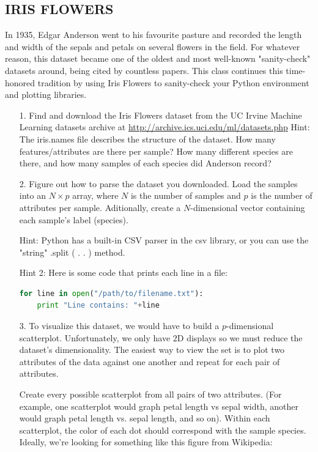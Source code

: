 \documentclass[10pt, a4paper]{article}
\begin{document}
\begin{Problem}
\section{IRIS FLOWERS}
In 1935, Edgar Anderson went to his favourite pasture and recorded the length and width of the sepals and petals on several flowers in the field. For whatever reason, this dataset became one of the oldest and most well-known "sanity-check" datasets around, being cited by countless papers. This class continues this time-honored tradition by using Iris Flowers to sanity-check your Python environment and plotting libraries.

\begin{enumerate}
  \item[1.] Find and download the Iris Flowers dataset from the UC Irvine Machine Learning datasets archive at \href{http://archive.ics.uci.edu/ml/datasets.php}{http://archive.ics.uci.edu/ml/datasets.php} Hint: The iris.names file describes the structure of the dataset. How many features/attributes are there per sample? How many different species are there, and how many samples of each species did Anderson record? 
  \item[2.] Figure out how to parse the dataset you downloaded. Load the samples into an $N \times p$ array, where $N$ is the number of samples and $p$ is the number of attributes per sample. Aditionally, create a $N$-dimensional vector containing each sample's label (species).


Hint: Python has a built-in CSV parser in the csv library, or you can use the "string" .split ( . . ) method.

Hint 2: Here is some code that prints each line in a file:

\begin{lstlisting}[language=Python]
for line in open("/path/to/filename.txt"):
    print "Line contains: "+line
\end{lstlisting}

  \item[3.] To visualize this dataset, we would have to build a $p$-dimensional scatterplot. Unfortunately, we only have $2 \mathrm{D}$ displays so we must reduce the dataset's dimensionality. The easiest way to view the set is to plot two attributes of the data against one another and repeat for each pair of attributes.

Create every possible scatterplot from all pairs of two attributes. (For example, one scatterplot would graph petal length vs sepal width, another would graph petal length vs. sepal length, and so on). Within each scatterplot, the color of each dot should correspond with the sample species. Ideally, we're looking for something like this figure from Wikipedia:


\end{enumerate}
\end{Problem}
\end{document}

